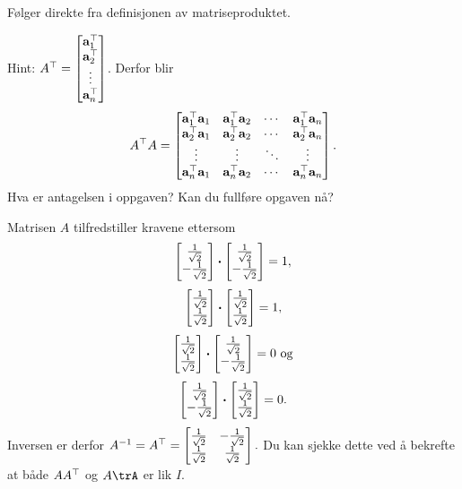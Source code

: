 \begin{losning}

\begin{punkt}
Følger direkte fra definisjonen av matriseproduktet.
\end{punkt}


\begin{punkt}
Hint: $A^\top=\begin{bmatrix}
\mathbf{a}_1^\top\\
\mathbf{a}_2^\top\\
\vdots\\
\mathbf{a}_n^\top
\end{bmatrix}$. Derfor blir
$$A^\top A=\begin{bmatrix}
\mathbf{a}_1^\top \mathbf{a}_1 & \mathbf{a}_1^\top \mathbf{a}_2 & \cdots & \mathbf{a}_1^\top\mathbf{a}_n\\
\mathbf{a}_2^\top \mathbf{a}_1 & \mathbf{a}_2^\top \mathbf{a}_2 & \cdots & \mathbf{a}_2^\top\mathbf{a}_n\\
\vdots & \vdots & \ddots & \vdots\\
\mathbf{a}_n^\top \mathbf{a}_1 & \mathbf{a}_n^\top \mathbf{a}_2 & \cdots & \mathbf{a}_n^\top\mathbf{a}_n
\end{bmatrix}.
$$ Hva er antagelsen i oppgaven? Kan du fullføre opgaven nå?

\end{punkt}


\begin{punkt}
Matrisen $A$ tilfredstiller kravene ettersom $$\begin{bmatrix} \frac{1}{\sqrt{2}} \\ -\frac{1}{\sqrt{2}} \end{bmatrix}\boldsymbol{\cdot} \begin{bmatrix} \frac{1}{\sqrt{2}} \\ -\frac{1}{\sqrt{2}} \end{bmatrix}=1,$$ $$\begin{bmatrix} \frac{1}{\sqrt{2}} \\ \frac{1}{\sqrt{2}} \end{bmatrix}\boldsymbol{\cdot}  \begin{bmatrix} \frac{1}{\sqrt{2}} \\ \frac{1}{\sqrt{2}} \end{bmatrix}=1,$$ $$\begin{bmatrix} \frac{1}{\sqrt{2}} \\ \frac{1}{\sqrt{2}} \end{bmatrix}\boldsymbol{\cdot}  \begin{bmatrix} \frac{1}{\sqrt{2}} \\ -\frac{1}{\sqrt{2}} \end{bmatrix}=0 \text{ og}$$ $$\begin{bmatrix} \frac{1}{\sqrt{2}} \\ -\frac{1}{\sqrt{2}} \end{bmatrix}\boldsymbol{\cdot}  \begin{bmatrix} \frac{1}{\sqrt{2}} \\ \frac{1}{\sqrt{2}} \end{bmatrix}=0.$$ Inversen er derfor $A^{-1}=A^\top=\begin{bmatrix}
\frac{1}{\sqrt{2}} & -\frac{1}{\sqrt{2}}\\
\frac{1}{\sqrt{2}} & \frac{1}{\sqrt{2}}
\end{bmatrix}.$ Du kan sjekke dette ved å bekrefte at både $AA^\top$ og $A\trA$ er lik $I$.
\end{punkt}


\end{losning}



